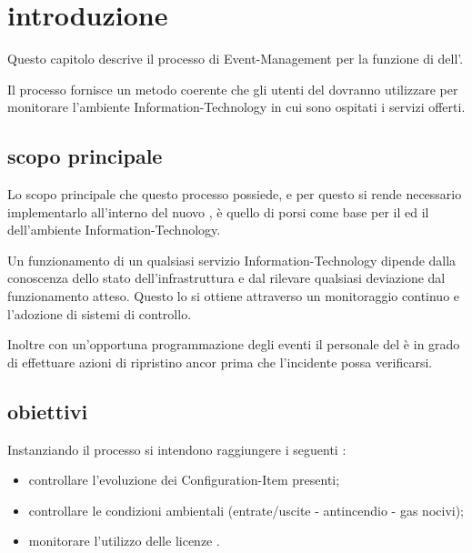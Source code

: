 %
%
\section[Introduzione]{introduzione}
\label{rf-introduction}
Questo capitolo descrive il processo di \acf{Event-Management} per la funzione di  dell'\entity{}.

Il processo fornisce un metodo coerente che gli utenti del  dovranno utilizzare per monitorare l'ambiente \acs{Information-Technology} in cui sono ospitati i servizi offerti.

\subsection[Scopo principale]{scopo principale}
\label{em-introduction-scope}
Lo scopo principale che questo processo possiede, e per questo si rende necessario implementarlo all'interno del nuovo , è quello di porsi come base per il  ed il  dell'ambiente \acs{Information-Technology}.

Un funzionamento  di un qualsiasi servizio \acs{Information-Technology} dipende dalla conoscenza dello stato dell'infrastruttura e dal rilevare qualsiasi deviazione dal funzionamento atteso. Questo lo si ottiene attraverso un monitoraggio continuo e l'adozione di sistemi di controllo.

Inoltre con un'opportuna programmazione degli eventi il personale del  è in grado di effettuare azioni di ripristino ancor prima che l'incidente possa verificarsi.

\subsection[Obiettivi]{obiettivi}
\label{em-introduction-objectives}
Instanziando il processo si intendono raggiungere i seguenti :

\begin{itemize}
\item{controllare l'evoluzione dei \ac{Configuration-Item} presenti;}
\item{controllare le condizioni ambientali (entrate/uscite - antincendio - gas nocivi);}
\item{monitorare l'utilizzo delle licenze .}
\end{itemize}

